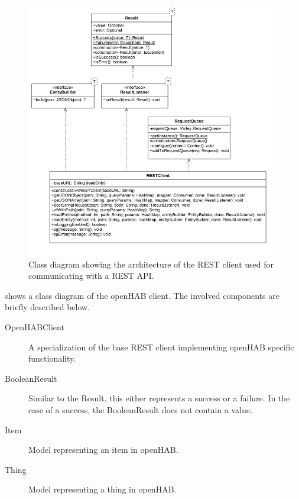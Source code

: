 \begin{figure}[h!]
\centering
\includegraphics[width=\textwidth]{images/uml-rest-client}
\caption{Class diagram showing the architecture of the REST client used for communicating with a REST API.}
\label{fig:communication-with-openhab:class-diagram-rest-client}
\end{figure}

 shows a class diagram of the openHAB client. The involved components are briefly described below.

\begin{description}
\item[OpenHABClient] A specialization of the base REST client implementing openHAB specific functionality.
\item[BooleanResult] Similar to the Result, this either represents a success or a failure. In the case of a success, the BooleanResult does not contain a value.
\item[Item] Model representing an item in openHAB.
\item[Thing] Model representing a thing in openHAB.
\end{description}

